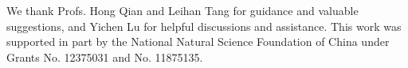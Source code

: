 \documentclass[aps,prl,reprint,superscriptaddress,nofootinbib,floatfix]{revtex4-2}
\begin{document}
\begin{acknowledgments}
We thank Profs. Hong Qian and Leihan Tang for guidance and valuable suggestions, and Yichen Lu for helpful discussions and assistance. This work was supported in part by the National Natural Science Foundation of China under Grants No. 12375031 and No. 11875135.
\end{acknowledgments}

\clearpage

\setlength{\bibsep}{0pt}

\end{document}
